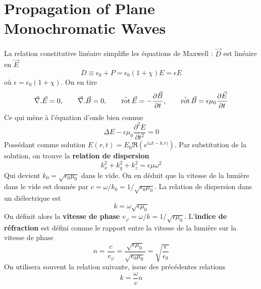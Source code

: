 \section{Propagation of Plane Monochromatic Waves}
La relation constitutive linéaire simplifie les équations de Maxwell : $\vec{D}$ est linéaire en $\vec{E}$
\begin{equation}
D\equiv \epsilon_0+P = \epsilon_0(1+\chi)E = \epsilon E
\end{equation}
où $\epsilon = \epsilon_0(1+\chi)$. On en tire
\begin{equation}
\vec\nabla .\vec E = 0, \qquad\vec\nabla .\vec B = 0,\qquad \operatorname{\vec{rot}}\vec{E} = -\frac{\partial\vec{B}}{\partial t}, 
\qquad\operatorname{\vec{rot}}\vec{B} = \epsilon\mu_0\frac{\partial \vec{E}}{\partial t}
\end{equation}
Ce qui mène à l'équation d'onde bien connue
\begin{equation}
\Delta E - \epsilon\mu_0\frac{\partial^2 E}{\partial t^2}=0
\end{equation}
Possédant comme solution $E(r,t) = E_0\Re\left(e^{i\omega t-k.r)}\right)$. Par substitution de la solution, 
on trouve la \textbf{relation de dispersion}
\begin{equation}
k^2_x+k^2_y+k^2_z = \epsilon\mu\omega^2
\end{equation}
Qui devient $k_0=\sqrt{\epsilon_0\mu_0}$ dans le vide. On en déduit que la vitesse de la lumière dans le 
vide est donnée par $c=\omega/k_0 = 1/\sqrt{\epsilon_0\mu_0}$. La relation de dispersion dans un diélectrique 
est
\begin{equation}
k = \omega\sqrt{\epsilon\mu_0}
\end{equation}
On définit alors la \textbf{vitesse de phase} $v_\varphi = \omega/k = 1/\sqrt{\epsilon\mu_0}$. L'\textbf{indice
de réfraction} est défini comme le rapport entre la vitesse de la lumière sur la vitesse de phase
\begin{equation}
n = \dfrac{c}{v_\varphi} = \dfrac{\sqrt{\epsilon\mu_0}}{\sqrt{\epsilon_0\mu_0}} = \sqrt{\dfrac{\epsilon}{\epsilon_0}}
\end{equation}
On utilisera souvent la relation suivante, issue des précédentes relations
\begin{equation}
k = \frac{\omega}{c}n
\end{equation}

\newpage
